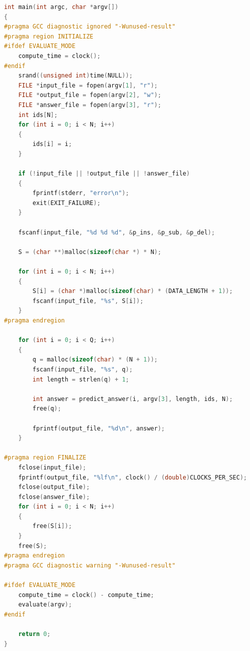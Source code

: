 \documentclass[dvipdfmx]{jsarticle}
\begin{document}
\begin{lstlisting}[language=C++]
int main(int argc, char *argv[])
{
#pragma GCC diagnostic ignored "-Wunused-result"
#pragma region INITIALIZE
#ifdef EVALUATE_MODE
	compute_time = clock();
#endif
	srand((unsigned int)time(NULL));
	FILE *input_file = fopen(argv[1], "r");
	FILE *output_file = fopen(argv[2], "w");
	FILE *answer_file = fopen(argv[3], "r");
	int ids[N];
	for (int i = 0; i < N; i++)
	{
		ids[i] = i;
	}

	if (!input_file || !output_file || !answer_file)
	{
		fprintf(stderr, "error\n");
		exit(EXIT_FAILURE);
	}

	fscanf(input_file, "%d %d %d", &p_ins, &p_sub, &p_del);

	S = (char **)malloc(sizeof(char *) * N);

	for (int i = 0; i < N; i++)
	{
		S[i] = (char *)malloc(sizeof(char) * (DATA_LENGTH + 1));
		fscanf(input_file, "%s", S[i]);
	}
#pragma endregion

	for (int i = 0; i < Q; i++)
	{
		q = malloc(sizeof(char) * (N + 1));
		fscanf(input_file, "%s", q);
		int length = strlen(q) + 1;

		int answer = predict_answer(i, argv[3], length, ids, N);
		free(q);

		fprintf(output_file, "%d\n", answer);
	}

#pragma region FINALIZE
	fclose(input_file);
	fprintf(output_file, "%lf\n", clock() / (double)CLOCKS_PER_SEC);
	fclose(output_file);
	fclose(answer_file);
	for (int i = 0; i < N; i++)
	{
		free(S[i]);
	}
	free(S);
#pragma endregion
#pragma GCC diagnostic warning "-Wunused-result"

#ifdef EVALUATE_MODE
	compute_time = clock() - compute_time;
	evaluate(argv);
#endif

	return 0;
}
\end{lstlisting}
\end{document}

